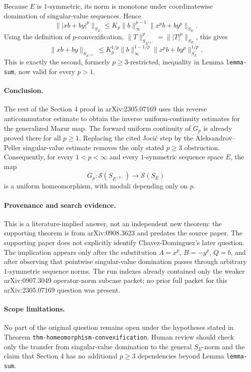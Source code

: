 \documentclass[11pt]{article}
\newcommand{\Sph}{\mathscr S}
\newcommand{\SE}{S_E}
\newcommand{\SEp}{S_{E^{(p)}}}
\begin{document}
Because \(E\) is \(1\)-symmetric, its norm is monotone under coordinatewise
domination of singular-value sequences.  Hence
\[
\big\||xb+by|^p\big\|_{\SE}
\le K_p\|b\|_\infty^{p-1}\|x^pb+by^p\|_{\SE}.
\]
Using the definition of \(p\)-convexification,
\(\|T\|_{\SEp}^p=\||T|^p\|_{\SE}\), this gives
\[
\|xb+by\|_{\SEp}
\le K_p^{1/p}\|b\|_\infty^{1-1/p}
     \|x^pb+by^p\|_{\SE}^{1/p}.
\]
This is exactly the second, formerly \(p\ge3\)-restricted, inequality in
Lemma \texttt{lemma-sum}, now valid for every \(p>1\).

\paragraph{Conclusion.}
The rest of the Section 4 proof in arXiv:2305.07169 uses this reverse
anticommutator estimate to obtain the inverse uniform-continuity estimates
for the generalized Mazur map.  The forward uniform continuity of \(G_p\) is
already proved there for all \(p\ge1\).  Replacing the cited Joci\'c step by
the Aleksandrov--Peller singular-value estimate removes the only stated
\(p\ge3\) obstruction.  Consequently, for every \(1<p<\infty\) and every
\(1\)-symmetric sequence space \(E\), the map
\[
G_p:\Sph(\SEp)\longrightarrow \Sph(\SE)
\]
is a uniform homeomorphism, with moduli depending only on \(p\).

\paragraph{Provenance and search evidence.}
This is a literature-implied answer, not an independent new theorem: the
supporting theorem is from arXiv:0908.3623 and predates the source paper.
The supporting paper does not explicitly identify Chavez-Dominguez's later
question.  The implication appears only after the substitution
\(A=x^p\), \(B=-y^p\), \(Q=b\), and after observing that pointwise
singular-value domination passes through arbitrary \(1\)-symmetric sequence
norms.  The run indexes already contained only the weaker arXiv:0907.3049
operator-norm subcase packet; no prior full packet for this
arXiv:2305.07169 question was present.

\paragraph{Scope limitations.}
No part of the original question remains open under the hypotheses stated in
Theorem \texttt{thm-homeomorphism-convexification}.  Human review should
check only the transfer from singular-value domination to the general
\(S_E\)-norm and the claim that Section 4 has no additional \(p\ge3\)
dependencies beyond Lemma \texttt{lemma-sum}.
\end{document}
